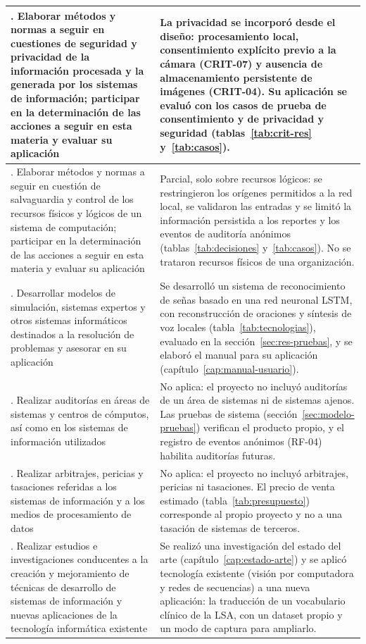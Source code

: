 {\begin{longtable}{>{\raggedright\arraybackslash}p{} >{\raggedright\arraybackslash}p{}}
    10. Elaborar métodos y normas a seguir en cuestiones de seguridad y privacidad de la información procesada y la generada por los sistemas de información; participar en la determinación de las acciones a seguir en esta materia y evaluar su aplicación & La privacidad se incorporó desde el diseño: procesamiento local, consentimiento explícito previo a la cámara (CRIT-07) y ausencia de almacenamiento persistente de imágenes (CRIT-04). Su aplicación se evaluó con los casos de prueba de consentimiento y de privacidad y seguridad (tablas~\ref{tab:crit-res} y~\ref{tab:casos}). \\ \midrule
    11. Elaborar métodos y normas a seguir en cuestión de salvaguardia y control de los recursos físicos y lógicos de un sistema de computación; participar en la determinación de las acciones a seguir en esta materia y evaluar su aplicación & Parcial, solo sobre recursos lógicos: se restringieron los orígenes permitidos a la red local, se validaron las entradas y se limitó la información persistida a los reportes y los eventos de auditoría anónimos (tablas~\ref{tab:decisiones} y~\ref{tab:casos}). No se trataron recursos físicos de una organización. \\ \midrule
    12. Desarrollar modelos de simulación, sistemas expertos y otros sistemas informáticos destinados a la resolución de problemas y asesorar en su aplicación & Se desarrolló un sistema de reconocimiento de señas basado en una red neuronal LSTM, con reconstrucción de oraciones y síntesis de voz locales (tabla~\ref{tab:tecnologias}), evaluado en la sección~\ref{sec:res-pruebas}, y se elaboró el manual para su aplicación (capítulo~\ref{cap:manual-usuario}). \\ \midrule
    13. Realizar auditorías en áreas de sistemas y centros de cómputos, así como en los sistemas de información utilizados & No aplica: el proyecto no incluyó auditorías de un área de sistemas ni de sistemas ajenos. Las pruebas de sistema (sección~\ref{sec:modelo-pruebas}) verifican el producto propio, y el registro de eventos anónimos (RF-04) habilita auditorías futuras. \\ \midrule
    14. Realizar arbitrajes, pericias y tasaciones referidas a los sistemas de información y a los medios de procesamiento de datos & No aplica: el proyecto no incluyó arbitrajes, pericias ni tasaciones. El precio de venta estimado (tabla~\ref{tab:presupuesto}) corresponde al propio proyecto y no a una tasación de sistemas de terceros. \\ \midrule
    15. Realizar estudios e investigaciones conducentes a la creación y mejoramiento de técnicas de desarrollo de sistemas de información y nuevas aplicaciones de la tecnología informática existente & Se realizó una investigación del estado del arte (capítulo~\ref{cap:estado-arte}) y se aplicó tecnología existente (visión por computadora y redes de secuencias) a una nueva aplicación: la traducción de un vocabulario clínico de la LSA, con un dataset propio y un modo de captura para ampliarlo. \\
    \bottomrule
\end{longtable}
}
